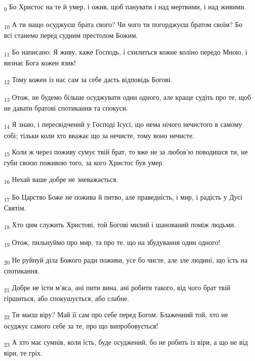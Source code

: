\begin{tcolorbox}
\textsubscript{9} Бо Христос на те й умер, і ожив, щоб панувати і над мертвими, і над живими.
\end{tcolorbox}
\begin{tcolorbox}
\textsubscript{10} А ти нащо осуджуєш брата свого? Чи чого ти погорджуєш братом своїм? Бо всі станемо перед судним престолом Божим.
\end{tcolorbox}
\begin{tcolorbox}
\textsubscript{11} Бо написано: Я живу, каже Господь, і схилиться кожне коліно передо Мною, і визнає Бога кожен язик!
\end{tcolorbox}
\begin{tcolorbox}
\textsubscript{12} Тому кожен із нас сам за себе дасть відповідь Богові.
\end{tcolorbox}
\begin{tcolorbox}
\textsubscript{13} Отож, не будемо більше осуджувати один одного, але краще судіть про те, щоб не давати братові спотикання та спокуси.
\end{tcolorbox}
\begin{tcolorbox}
\textsubscript{14} Я знаю, і пересвідчений у Господі Ісусі, що нема нічого нечистого в самому собі; тільки коли хто вважає що за нечисте, тому воно нечисте.
\end{tcolorbox}
\begin{tcolorbox}
\textsubscript{15} Коли ж через поживу сумує твій брат, то вже не за любов'ю поводишся ти, не губи своєю поживою того, за кого Христос був умер.
\end{tcolorbox}
\begin{tcolorbox}
\textsubscript{16} Нехай ваше добре не зневажається.
\end{tcolorbox}
\begin{tcolorbox}
\textsubscript{17} Бо Царство Боже не пожива й питво, але праведність, і мир, і радість у Дусі Святім.
\end{tcolorbox}
\begin{tcolorbox}
\textsubscript{18} Хто цим служить Христові, той Богові милий і шанований поміж людьми.
\end{tcolorbox}
\begin{tcolorbox}
\textsubscript{19} Отож, пильнуймо про мир, та про те, що на збудування один одного!
\end{tcolorbox}
\begin{tcolorbox}
\textsubscript{20} Не руйнуй діла Божого ради поживи, усе бо чисте, але зле людині, що їсть на спотикання.
\end{tcolorbox}
\begin{tcolorbox}
\textsubscript{21} Добре не їсти м'яса, ані пити вина, ані робити такого, від чого брат твій гіршиться, або спокушується, або слабне.
\end{tcolorbox}
\begin{tcolorbox}
\textsubscript{22} Ти маєш віру? Май її сам про себе перед Богом. Блаженний той, хто не осуджує самого себе за те, про що випробовується!
\end{tcolorbox}
\begin{tcolorbox}
\textsubscript{23} А хто має сумнів, коли їсть, буде осуджений, бо не робить із віри, а що не від віри, те гріх.
\end{tcolorbox}
